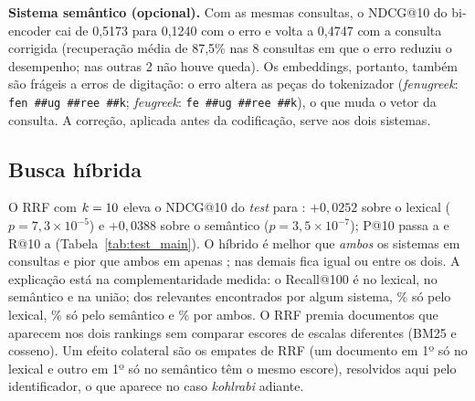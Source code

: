 \textbf{Sistema semântico (opcional).} Com as mesmas consultas, o NDCG@10 do bi-encoder cai de 0,5173 para 0,1240 com o erro e volta a 0,4747 com a consulta corrigida (recuperação média de 87,5\% nas 8 consultas em que o erro reduziu o desempenho; nas outras 2 não houve queda). Os embeddings, portanto, também são frágeis a erros de digitação: o erro altera as peças do tokenizador (\emph{fenugreek}: \texttt{fen\,\#\#ug\,\#\#ree\,\#\#k}; \emph{feugreek}: \texttt{fe\,\#\#ug\,\#\#ree\,\#\#k}), o que muda o vetor da consulta. A correção, aplicada antes da codificação, serve aos dois sistemas.

\subsection{Busca híbrida}
O RRF com $k=10$ eleva o NDCG@10 do \emph{test} para \NdcgTenHyb{}: $+0{,}0252$ sobre o lexical ($p=7{,}3\times10^{-5}$) e $+0{,}0388$ sobre o semântico ($p=3{,}5\times10^{-7}$); P@10 passa a \PTenHyb{} e R@10 a \RTenHyb{} (Tabela~\ref{tab:test_main}). O híbrido é melhor que \emph{ambos} os sistemas em \HybBeatBoth{} consultas e pior que ambos em apenas \HybLoseBoth{}; nas demais \HybBetween{} fica igual ou entre os dois. A explicação está na complementaridade medida: o Recall@100 é \RecLexHundred{} no lexical, \RecSemHundred{} no semântico e \RecUnionHundred{} na união; dos relevantes encontrados por algum sistema, \OnlyLexPct\% só pelo lexical, \OnlySemPct\% só pelo semântico e \BothPct\% por ambos. O RRF premia documentos que aparecem nos dois rankings sem comparar escores de escalas diferentes (BM25 e cosseno). Um efeito colateral são os empates de RRF (um documento em 1º só no lexical e outro em 1º só no semântico têm o mesmo escore), resolvidos aqui pelo identificador, o que aparece no caso \emph{kohlrabi} adiante.

